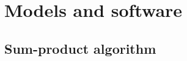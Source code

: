\documentclass[article]{jss}
\newif\ifen
\newcommand{\en}[1]{\ifen#1\fi}
\begin{document}
\newpage






















































































\section{Models and software} 

\en{}
\en{En esta secci\'on daremos la soluci\'on matem\'atica del modelo completo de TTT}


\subsection{Sum-product algorithm} \label{sec:sumProductAlgorithm}
\end{document}
